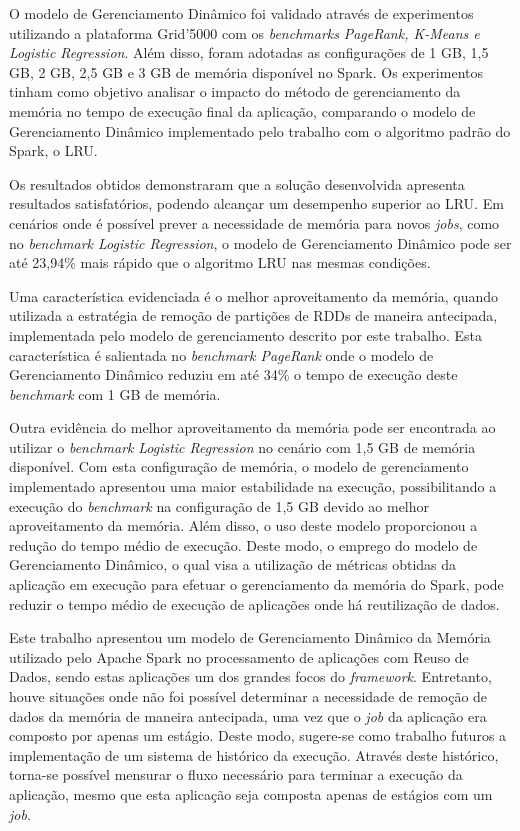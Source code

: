 O modelo de Gerenciamento Dinâmico foi validado através de experimentos utilizando a plataforma Grid'5000 com os \textit{benchmarks} \textit{PageRank, K-Means e Logistic Regression}. Além disso, foram adotadas as configurações de 1 GB, 1,5 GB, 2 GB, 2,5 GB e 3 GB de memória disponível no Spark. Os experimentos tinham como objetivo analisar o impacto do método de gerenciamento da memória no tempo de execução final da aplicação, comparando o modelo de Gerenciamento Dinâmico implementado pelo trabalho com o algoritmo padrão do Spark, o LRU.

Os resultados obtidos demonstraram que a solução desenvolvida apresenta resultados satisfatórios, podendo alcançar um desempenho superior ao LRU. Em cenários onde é possível prever a necessidade de memória para novos \textit{jobs}, como no \textit{benchmark Logistic Regression}, o modelo de Gerenciamento Dinâmico pode ser até 23,94\% mais rápido que o algoritmo LRU nas mesmas condições. 

Uma característica evidenciada é o melhor aproveitamento da memória, quando utilizada a estratégia de remoção de partições de RDDs de maneira antecipada, implementada pelo modelo de gerenciamento descrito por este trabalho. Esta característica é salientada no \textit{benchmark PageRank} onde o modelo de Gerenciamento Dinâmico reduziu em até 34\% o tempo de execução deste \textit{benchmark} com 1 GB de memória. 

Outra evidência do melhor aproveitamento da memória pode ser encontrada ao utilizar o \textit{benchmark} \textit{Logistic Regression} no cenário com 1,5 GB de memória disponível. Com esta configuração de memória, o modelo de gerenciamento implementado apresentou uma maior estabilidade na execução, possibilitando a execução do \textit{benchmark} na configuração de 1,5 GB devido ao melhor aproveitamento da memória. Além disso, o uso deste modelo proporcionou a redução do tempo médio de execução. Deste modo, o emprego do modelo de Gerenciamento Dinâmico, o qual visa a utilização de métricas obtidas da aplicação em execução para efetuar o gerenciamento da memória do Spark, pode reduzir o tempo médio de execução de aplicações onde há reutilização de dados.

Este trabalho apresentou um modelo de Gerenciamento Dinâmico da Memória utilizado pelo Apache Spark no processamento de aplicações com Reuso de Dados, sendo estas aplicações um dos grandes focos do \textit{framework}. Entretanto, houve situações onde não foi possível determinar a necessidade de remoção de dados da memória de maneira antecipada, uma vez que o \textit{job} da aplicação era composto por apenas um estágio. Deste modo, sugere-se como trabalho futuros a implementação de um sistema de histórico da execução. Através deste histórico, torna-se possível mensurar o fluxo necessário para terminar a execução da aplicação, mesmo que esta aplicação seja composta apenas de estágios com um \textit{job}.


